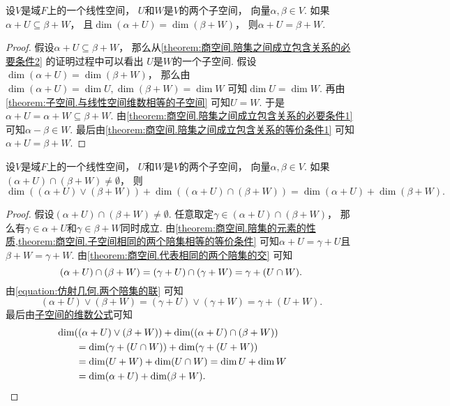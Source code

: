 \begin{theorem}
设\(V\)是域\(F\)上的一个线性空间，
\(U\)和\(W\)是\(V\)的两个子空间，
向量\(\alpha,\beta \in V\).
如果\(\alpha + U \subseteq \beta + W\)，
且\(\dim(\alpha + U) = \dim(\beta + W)\)，
则\(\alpha + U = \beta + W\).
\begin{proof}
假设\(\alpha + U \subseteq \beta + W\)，
那么从\cref{theorem:商空间.陪集之间成立包含关系的必要条件2} 的证明过程中可以看出
\(U\)是\(W\)的一个子空间.
假设\(\dim(\alpha + U) = \dim(\beta + W)\)，
那么由\(
	\dim(\alpha + U) = \dim U,
	\dim(\beta + W) = \dim W
\)
可知\(\dim U = \dim W\).
再由\cref{theorem:子空间.与线性空间维数相等的子空间}
可知\(U = W\).
于是\(\alpha + U = \alpha + W \subseteq \beta + W\).
由\cref{theorem:商空间.陪集之间成立包含关系的必要条件1}
可知\(\alpha - \beta \in W\).
最后由\cref{theorem:商空间.陪集之间成立包含关系的等价条件1}
可知\(\alpha + U = \beta + W\).
\end{proof}
\end{theorem}

\begin{theorem}
设\(V\)是域\(F\)上的一个线性空间，
\(U\)和\(W\)是\(V\)的两个子空间，
向量\(\alpha,\beta \in V\).
如果\((\alpha + U) \cap (\beta + W) \neq \emptyset\)，
则\begin{equation*}
	\dim((\alpha + U) \vee (\beta + W))
	+ \dim((\alpha + U) \cap (\beta + W))
	= \dim(\alpha + U)
	+ \dim(\beta + W).
\end{equation*}
\begin{proof}
假设\((\alpha + U) \cap (\beta + W) \neq \emptyset\).
任意取定\(\gamma \in (\alpha + U) \cap (\beta + W)\)，
那么有\(\gamma \in \alpha + U\)和\(\gamma \in \beta + W\)同时成立.
由\cref{theorem:商空间.陪集的元素的性质,theorem:商空间.子空间相同的两个陪集相等的等价条件}
可知\(\alpha + U = \gamma + U\)且\(\beta + W = \gamma + W\).
由\cref{theorem:商空间.代表相同的两个陪集的交}
可知\begin{equation*}
	(\alpha + U) \cap (\beta + W)
	= (\gamma + U) \cap (\gamma + W) \\
	= \gamma + (U \cap W).
\end{equation*}
由\cref{equation:仿射几何.两个陪集的联}
可知\begin{equation*}
	(\alpha + U) \vee (\beta + W)
	= (\gamma + U) \vee (\gamma + W)
	= \gamma + (U + W).
\end{equation*}
最后由\hyperref[theorem:线性空间.子空间.子空间的维数公式]{子空间的维数公式}可知\begin{align*}
	&\hspace{-20pt}
	\dim((\alpha + U) \vee (\beta + W))
		+ \dim((\alpha + U) \cap (\beta + W)) \\
	&= \dim(\gamma + (U \cap W))
		+ \dim(\gamma + (U + W)) \\
	&= \dim(U + W)
		+ \dim(U \cap W)
	= \dim U + \dim W \\
	&= \dim(\alpha + U) + \dim(\beta + W).
	\qedhere
\end{align*}
\end{proof}
\end{theorem}

